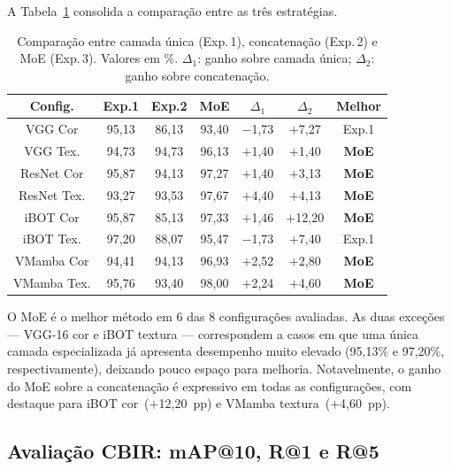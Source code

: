 \documentclass[letterpaper, 10 pt, conference]{ieeeconf}
\begin{document}
A Tabela~\ref{tab_comparacao} consolida a comparação entre as três
estratégias.

\begin{table}[htbp]
\caption{Comparação entre camada única (Exp.\,1), concatenação (Exp.\,2)
         e MoE (Exp.\,3). Valores em \%. $\Delta_1$: ganho sobre camada
         única; $\Delta_2$: ganho sobre concatenação.}
\begin{center}
\begin{tabular}{c|c|c|c|c|c|c}
\hline
\textbf{Config.} & \textbf{Exp.1} & \textbf{Exp.2}
                 & \textbf{MoE} & \textbf{$\Delta_1$}
                 & \textbf{$\Delta_2$} & \textbf{Melhor} \\
\hline
VGG Cor      & 95,13 & 86,13 & 93,40 & $-$1,73 & $+$7,27  & Exp.1 \\
VGG Tex.     & 94,73 & 94,73 & 96,13 & $+$1,40 & $+$1,40  & \textbf{MoE} \\
ResNet Cor   & 95,87 & 94,13 & 97,27 & $+$1,40 & $+$3,13  & \textbf{MoE} \\
ResNet Tex.  & 93,27 & 93,53 & 97,67 & $+$4,40 & $+$4,13  & \textbf{MoE} \\
iBOT Cor     & 95,87 & 85,13 & 97,33 & $+$1,46 & $+$12,20 & \textbf{MoE} \\
iBOT Tex.    & 97,20 & 88,07 & 95,47 & $-$1,73 & $+$7,40  & Exp.1 \\
VMamba Cor   & 94,41 & 94,13 & 96,93 & $+$2,52 & $+$2,80  & \textbf{MoE} \\
VMamba Tex.  & 95,76 & 93,40 & 98,00 & $+$2,24 & $+$4,60  & \textbf{MoE} \\
\hline
\end{tabular}
\label{tab_comparacao}
\end{center}
\end{table}

O MoE é o melhor método em 6 das 8 configurações avaliadas.
As duas exceções — VGG-16 cor e iBOT textura — correspondem a casos em que
uma única camada especializada já apresenta desempenho muito elevado
(95,13\% e 97,20\%, respectivamente), deixando pouco espaço para melhoria.
Notavelmente, o ganho do MoE sobre a concatenação é expressivo em todas as
configurações, com destaque para iBOT cor~($+$12,20~pp) e VMamba
textura~($+$4,60~pp).

\subsection{Avaliação CBIR: mAP@10, R@1 e R@5}
\end{document}
